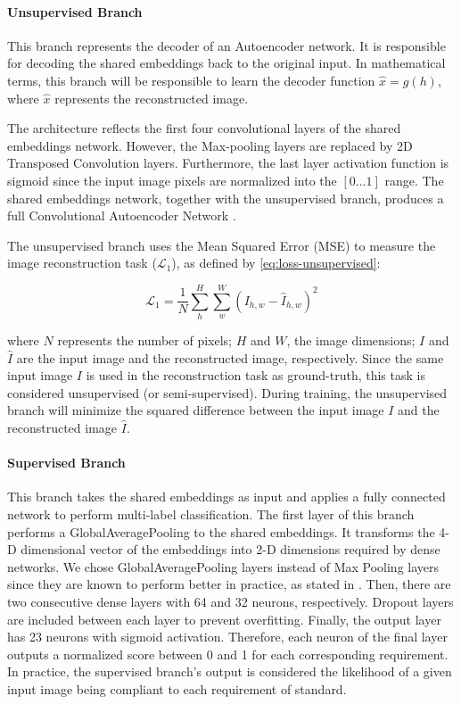 \paragraph{Unsupervised Branch}

This branch represents the decoder of an Autoencoder network. It is responsible for decoding the shared embeddings back to the original input. In mathematical terms, this branch will be responsible to learn the decoder function $\hat{x} = g(h)$, where $\hat{x}$ represents the reconstructed image. 

The architecture reflects the first four convolutional layers of the shared embeddings network. However, the Max-pooling layers are replaced by 2D Transposed Convolution layers. Furthermore, the last layer activation function is sigmoid since the input image pixels are normalized into the $[0...1]$ range. The shared embeddings network, together with the unsupervised branch, produces a full Convolutional Autoencoder Network \citep{goodfellow2016deep}.

The unsupervised branch uses the Mean Squared Error (MSE) to measure the image reconstruction task ($\mathcal{L}_1$), as defined by \autoref{eq:loss-unsupervised}:

\begin{equation}
\label{eq:loss-unsupervised}
\mathcal{L}_1 = \frac{1}{N} \sum_h^H \sum_w^W ({I_{h,w} - \hat{I}_{h,w}})^2
\end{equation}

\noindent where $N$ represents the number of pixels; $H$ and $W$, the image dimensions; $I$ and $\hat{I}$ are the input image and the reconstructed image, respectively. Since the same input image $I$ is used in the reconstruction task as ground-truth, this task is considered unsupervised (or semi-supervised). During training, the unsupervised branch will minimize the squared difference between the input image $I$ and the reconstructed image $\hat{I}$.

\paragraph{Supervised Branch}

This branch takes the shared embeddings as input and applies a fully connected network to perform multi-label classification. The first layer of this branch performs a GlobalAveragePooling to the shared embeddings. It transforms the 4-D dimensional vector of the embeddings into 2-D dimensions required by dense networks. We chose GlobalAveragePooling layers instead of Max Pooling layers since they are known to perform better in practice, as stated in \cite{zhou2016learning}. Then, there are two consecutive dense layers with 64 and 32 neurons, respectively. Dropout layers are included between each layer to prevent overfitting. Finally, the output layer has 23 neurons with sigmoid activation. Therefore, each neuron of the final layer outputs a normalized score between 0 and 1 for each corresponding requirement. In practice, the supervised branch's output is considered the likelihood of a given input image being compliant to each requirement of \icao standard.

